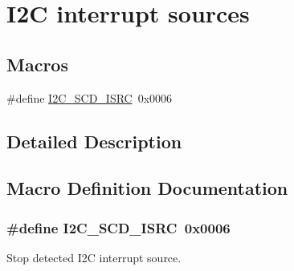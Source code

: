 \hypertarget{group__isr_srcs}{\section{I2\-C interrupt sources}
\label{group__isr_srcs}
}
\subsection*{Macros}
\begin{DoxyCompactItemize}
\item 
\#define \hyperlink{group__isr_srcs_gaa26238e86d534cda62318e98e1655654}{I2\-C\-\_\-\-S\-C\-D\-\_\-\-I\-S\-R\-C}~0x0006
\end{DoxyCompactItemize}


\subsection{Detailed Description}


\subsection{Macro Definition Documentation}
\hypertarget{group__isr_srcs_gaa26238e86d534cda62318e98e1655654}{
\subsubsection[{I2\-C\-\_\-\-S\-C\-D\-\_\-\-I\-S\-R\-C}]{\setlength{\rightskip}{0pt plus 5cm}\#define I2\-C\-\_\-\-S\-C\-D\-\_\-\-I\-S\-R\-C~0x0006}}\label{group__isr_srcs_gaa26238e86d534cda62318e98e1655654}
Stop detected I2\-C interrupt source. 